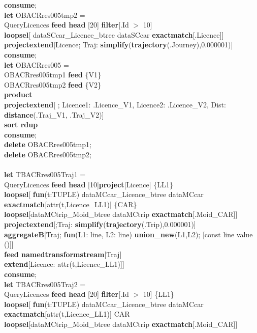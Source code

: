 \documentclass[a4paper]{article}
\newcommand{\op}[1]{\textbf{#1}}
\begin{document}
\begin{scriptsize}
\begin{tabbing}
\op{consume};\\
\op{let} OBACRres005tmp2 =\\
\>QueryLicences \op{feed head} [20] \op{filter}[.Id $>$ 10]\\
\>\op{loopsel}[ dataSCcar\_Licence\_btree dataSCcar \op{exactmatch}[.Licence]]\\
\>\op{projectextend}[Licence; Traj: \op{simplify}(\op{trajectory}(.Journey),0.000001)]\\
\op{consume};\\
\op{let} OBACRres005 = \\
\>OBACRres005tmp1 \op{feed} \{V1\}\\
\>OBACRres005tmp2 \op{feed} \{V2\}\\
\>\op{product}\\
\>\op{projectextend}[ ; Licence1: .Licence\_V1, Licence2: .Licence\_V2, Dist: \op{distance}(.Traj\_V1, .Traj\_V2)]\\
\>\op{sort rdup}\\
\op{consume};\\
\op{delete} OBACRres005tmp1;\\
\op{delete} OBACRres005tmp2;\\
\\
\op{let} TBACRres005Traj1 =\\
\>QueryLicences \op{feed head} [10]\op{project}[Licence] \{LL1\}\\
\>\op{loopsel}[ \op{fun}(t:TUPLE) dataMCcar\_Licence\_btree dataMCcar \op{exactmatch}[attr(t,Licence\_LL1)] \{CAR\}\\
\>\>\op{loopsel}[dataMCtrip\_Moid\_btree dataMCtrip \op{exactmatch}[.Moid\_CAR]]\\
\>\op{projectextend}[;Traj: \op{simplify}(\op{trajectory}(.Trip),0.000001)]\\
\>\op{aggregateB}[Traj; \op{fun}(L1: line, L2: line)\op{ union\_new}(L1,L2); [const line value ()]]\\
\>\op{feed namedtransformstream}[Traj]\\
\>\op{extend}[Licence: attr(t,Licence\_LL1)]]\\
\op{consume};\\
\op{let} TBACRres005Traj2 =\\
\>QueryLicences \op{feed head} [20] \op{filter}[.Id $>$ 10] \{LL1\}\\
\>\op{loopsel}[ \op{fun}(t:TUPLE) dataMCcar\_Licence\_btree dataMCcar \op{exactmatch}[attr(t,Licence\_LL1)] {CAR}\\
\>\>\op{loopsel}[dataMCtrip\_Moid\_btree dataMCtrip \op{exactmatch}[.Moid\_CAR]]\\

\end{tabbing}
\end{scriptsize}
\end{document}
